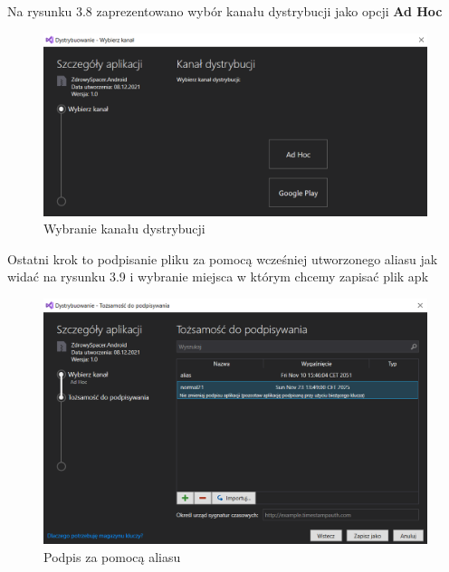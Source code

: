\newpage
 Na rysunku 3.8 zaprezentowano wybór kanału dystrybucji jako opcji \textbf{Ad Hoc}
 \begin{figure}[!htb]
 	\begin{center}
 		\includegraphics[width=12cm]{rys/apk_4.png}
 		\caption{Wybranie kanału dystrybucji}
 		\label{rys:rysunek010}
 	\end{center}
 \end{figure}
 \newline Ostatni krok to podpisanie pliku za pomocą wcześniej utworzonego aliasu jak widać na rysunku 3.9 i wybranie miejsca w którym chcemy zapisać plik apk
 \begin{figure}[!htb]
 	\begin{center}
 		\includegraphics[width=12cm]{rys/apk_5.png}
 		\caption{Podpis za pomocą aliasu}
 		\label{rys:rysunek011}
 	\end{center}
 \end{figure}
 
